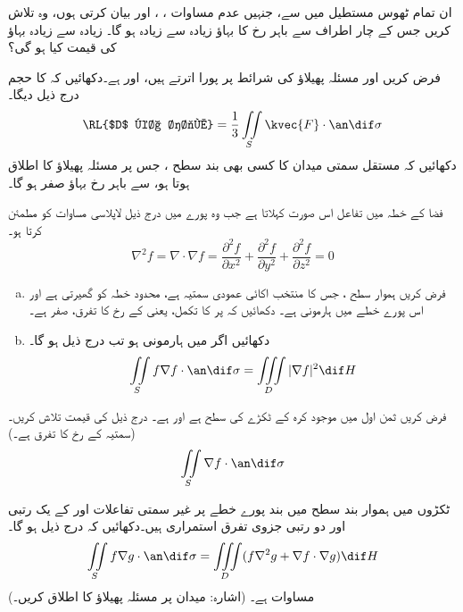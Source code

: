\quad
ان تمام ٹھوس   مستطیل میں سے،  جنہیں عدم مساوات ،  ، اور  بیان کرتی ہوں، وہ تلاش کریں جس کے چار اطراف سے باہر رخ  کا بہاؤ زیادہ سے زیادہ ہو گا۔ زیادہ سے زیادہ بہاؤ کی قیمت کیا ہو گی؟

\quad
فرض کریں  اور  مسئلہ پھیلاؤ کی شرائط پر پورا اترتے ہیں، اور  ہے۔دکھائیں کہ  کا حجم درج ذیل دیگا۔
\[\text{\RL{$D$ کا حجم}}=\frac{1}{3}\iint\limits_S\kvec{F}\cdot\an\dif\sigma\]
\quad
دکھائیں کہ مستقل سمتی میدان  کا  کسی بھی بند سطح ، جس پر مسئلہ پھیلاؤ کا اطلاق ہوتا ہو، سے باہر رخ  بہاؤ صفر ہو گا۔

\quad
فضا کے خطہ   میں تفاعل  اس صورت کہلاتا ہے  جب وہ پورے  میں درج ذیل  لاپلاسی مساوات کو مطمئن کرتا ہو۔
\[\nabla^2f=\nabla\cdot\nabla f=\frac{\partial^2f}{\partial x^2}+\frac{\partial^2f}{\partial y^2}+\frac{\partial^2f}{\partial z^2}=0\]
\begin{enumerate}[a.]
\item
فرض کریں ہموار سطح     ، جس کا منتخب اکائی عمودی سمتیہ  ہے، محدود خطہ   کو گھیرتی ہے اور  
اس  پورے خطے میں ہارمونی ہے۔ دکھائیں کہ  پر  کا تکمل،  یعنی  کے رخ   کا تفرق، صفر ہے۔
\item
دکھائیں اگر  میں  ہارمونی ہو تب درج ذیل ہو گا۔
\[\iint\limits_Sf\nabla f\cdot \an\dif\sigma=\iiint\limits_D|\nabla f|^2\dif H\]
\end{enumerate}

 \quad
فرض کریں ثمن اول میں موجود کرہ  کے ٹکڑے کی سطح  ہے اور  ہے۔ درج ذیل کی قیمت تلاش کریں۔ (سمتیہ  کے رخ  کا تفرق  ہے۔)
\[\iint\limits_S \nabla f\cdot\an\dif\sigma\]

\quad
ٹکڑوں میں ہموار بند  سطح  میں بند  پورے خطے   پر غیر سمتی تفاعلات  اور   کے یک رتبی اور  دو رتبی جزوی تفرق  استمراری ہیں۔دکھائیں کہ درج ذیل ہو گا۔
\begin{align}\label{مساوات_سمتی_میدان_گرین_کلیہ_اول}
\iint\limits_S f\nabla g\cdot \an\dif\sigma=\iiint\limits_D (f\nabla^2g+\nabla f\cdot \nabla g)\dif H
\end{align}
مساوات  ہے۔ (اشارہ: میدان  پر مسئلہ پھیلاؤ کا اطلاق کریں۔)

